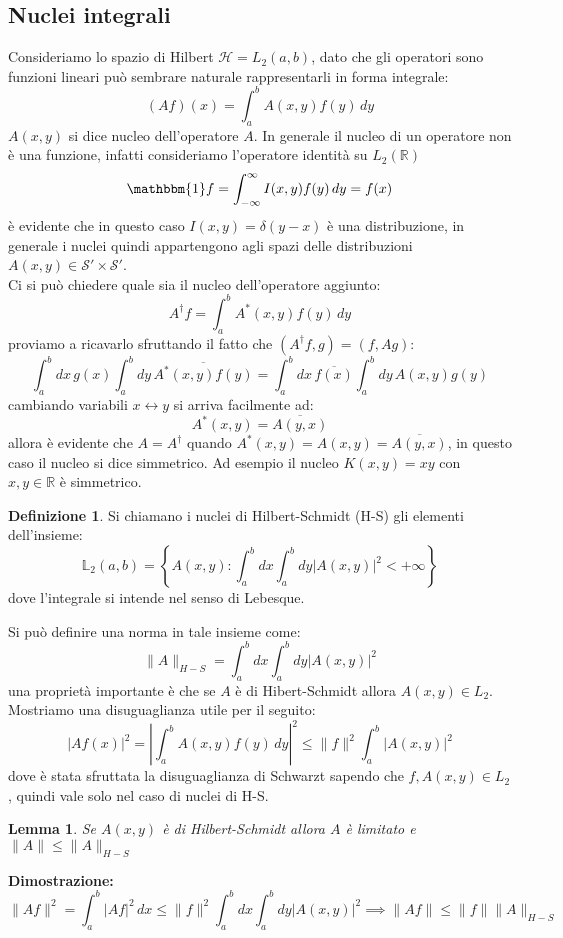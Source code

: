 \documentclass[12pt]{book}
\theoremstyle{plain}
\newcommand{\R}{\mathbb{R}}
\renewcommand{\H}{\mathcal{H}}
\newtheorem{lem}[thm]{Lemma}
\theoremstyle{definition}
\newtheorem{dfn}[thm]{Definizione}
\theoremstyle{remark}
\begin{document}
\subsection{Nuclei integrali}
Consideriamo lo spazio di Hilbert $\H = L_2(a,b)$, dato che gli operatori sono funzioni lineari può sembrare naturale rappresentarli in forma integrale:
\[(Af)(x) = \int_a^b A(x,y)f(y)\,dy\]
$A(x,y)$ si dice nucleo dell'operatore $A$. In generale il nucleo di un operatore non è una funzione, infatti consideriamo l'operatore identità su $L_2(\R)$
\[\mathbbm{1}f = \int_{-\infty}^{\infty} I(x,y)f(y)\,dy = f(x)\]
è evidente che in questo caso $I(x,y) = \delta(y-x)$ è una distribuzione, in generale i nuclei quindi appartengono agli spazi delle distribuzioni $A(x,y) \in \mathcal{S}'\times \mathcal{S}'$. \\
Ci si può chiedere quale sia il nucleo dell'operatore aggiunto:
\[A^\dagger f = \int_a^bA^*(x,y)f(y)\,dy\]
proviamo a ricavarlo sfruttando il fatto che $(A^\dagger f,g) = (f,Ag)$:
\[\int_a^b dx\, g(x)\int_a^bdy\,\overline{A^*(x,y)f(y)} = \int_a^bdx\, \overline{f(x)}\int_a^bdy\, A(x,y)g(y) \]
cambiando variabili $x\leftrightarrow y$ si arriva facilmente ad:
\[A^*(x,y) = \overline{A(y,x)}\]
allora è evidente che $A= A^\dagger$ quando $A^*(x,y) = A(x,y) = \overline{A(y,x)}$, in questo caso il nucleo si dice simmetrico. Ad esempio il nucleo $K(x,y) = xy$ con $x,y\in\R$ è simmetrico.
\begin{dfn}
Si chiamano i nuclei di Hilbert-Schmidt (H-S) gli elementi dell'insieme:
\[\mathbb{L}_2(a,b) = \left\{A(x,y) : \int_a^bdx\int_a^bdy|A(x,y)|^2<+\infty\right\}\]
dove l'integrale si intende nel senso di Lebesque.
\end{dfn}
Si può definire una norma in tale insieme come:
\[\|A\|_{H-S} =  \int_a^bdx\int_a^bdy|A(x,y)|^2\]
una proprietà importante è che se $A$ è di Hibert-Schmidt allora $A(x,y)\in L_2$.
\\Mostriamo una disuguaglianza utile per il seguito:
\[|Af(x)|^2 = \left|\int_a^b A(x,y)f(y)\,dy\right|^2 \leq \|f\|^2 \int_a^b |A(x,y)|^2\]
dove è stata sfruttata la disuguaglianza di Schwarzt sapendo che $f,A(x,y)\in L_2$, quindi vale solo nel caso di nuclei di H-S.
\begin{lem}
Se $A(x,y)$ è di Hilbert-Schmidt allora $A$ è limitato e $\|A\| \leq \|A\|_{H-S}$
\end{lem}
\hspace{-1.6em}\textbf{Dimostrazione:}
\[\|Af\|^2  =\int_a^b|Af|^2\,dx \leq \|f\|^2 \int_a^bdx\int_a^bdy|A(x,y)|^2 \implies \|Af\| \leq \|f\|\|A\|_{H-S} \]
\end{document}
